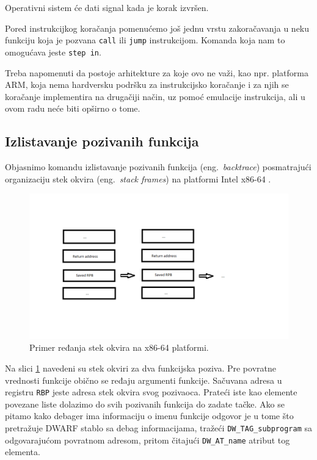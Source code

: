 \documentclass[12pt,oneside]{memoir}
\begin{document}
Operativni sistem će dati signal kada je korak izvršen.

Pored instrukcijkog koračanja pomenućemo još jednu vrstu zakoračavanja u neku funkciju koja je pozvana \texttt{call} ili \texttt{jump} instrukcijom. Komanda koja nam to omogućava jeste \texttt{step in}.

Treba napomenuti da postoje arhitekture za koje ovo ne važi, kao npr. platforma ARM, koja nema hardversku podršku za instrukcijsko koračanje i za njih se koračanje implementira na drugačiji način, uz pomoć emulacije instrukcija, ali u ovom radu neće biti opširno o tome.

\subsection{Izlistavanje pozivanih funkcija}

Objasnimo komandu izlistavanje pozivanih funkcija (eng.~\emph{backtrace}) posmatrajući organizaciju stek okvira (eng.~\emph{stack frames}) na platformi Intel x86-64 \cite{GDB}.

\begin{figure}[h!]
	\begin{center}
		\includegraphics[scale=0.6]{slike/stack_frame.png}
	\end{center}
	\caption{Primer ređanja stek okvira na x86-64 platformi.}
	\label{fig:stack}
\end{figure}

Na slici \ref{fig:stack} navedeni su stek okviri za dva funkcijska poziva. Pre povratne vrednosti funkcije obično se ređaju argumenti funkcije. Sačuvana adresa u registru \texttt{RBP} jeste adresa stek okvira svog pozivaoca. Prateći iste kao elemente povezane liste dolazimo do svih pozivanih funkcija do zadate tačke. Ako se pitamo kako debager ima informaciju o imenu funkcije odgovor je u tome što pretražuje DWARF stablo sa debag informacijama, tražeći \texttt{DW\_TAG\_subprogram} sa odgovarajućom povratnom adresom, pritom čitajući \texttt{DW\_AT\_name} atribut tog elementa.
\end{document}
